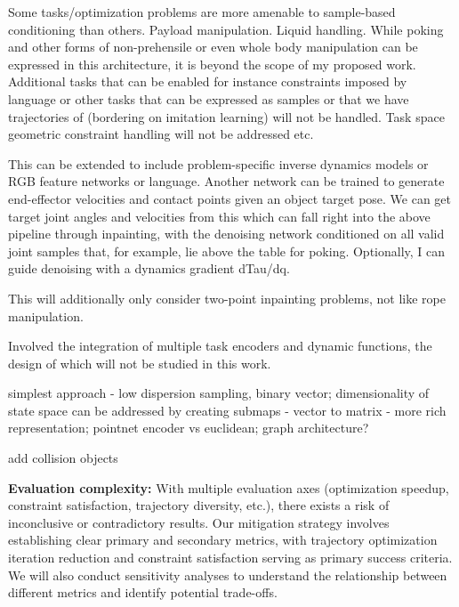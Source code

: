 Some tasks/optimization problems are more amenable to sample-based conditioning than others. Payload manipulation. Liquid handling.
While poking and other forms of non-prehensile or even whole body manipulation can be expressed in this architecture, it is beyond the scope of my proposed work. Additional tasks that can be enabled for instance constraints imposed by language or other tasks that can be expressed as samples or that we have trajectories of (bordering on imitation learning) will not be handled. Task space geometric constraint handling will not be addressed etc.

This can be extended to include problem-specific inverse dynamics models or RGB feature networks or language.
Another network can be trained to generate end-effector velocities and contact points given an object target pose.
We can get target joint angles and velocities from this which can fall right into the above pipeline through inpainting, with the denoising network conditioned on all valid joint samples that, for example, lie above the table for poking.
Optionally, I can guide denoising with a dynamics gradient dTau/dq.

This will additionally only consider two-point inpainting problems, not like rope manipulation.

Involved the integration of multiple task encoders and dynamic functions, the design of which will not be studied in this work.




simplest approach - low dispersion sampling, binary vector; 
dimensionality of state space can be addressed by creating submaps - vector to matrix - more rich representation; 
pointnet encoder vs euclidean; 
graph architecture?


add collision objects



   \item \textbf{Evaluation complexity:} With multiple evaluation axes (optimization speedup, constraint satisfaction, trajectory diversity, etc.), there exists a risk of inconclusive or contradictory results. Our mitigation strategy involves establishing clear primary and secondary metrics, with trajectory optimization iteration reduction and constraint satisfaction serving as primary success criteria. We will also conduct sensitivity analyses to understand the relationship between different metrics and identify potential trade-offs.


